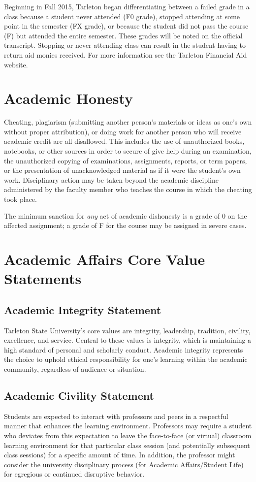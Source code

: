 \documentclass[10pt]{article}
\begin{document}
Beginning in Fall 2015, Tarleton began differentiating between a failed grade in a class because a student never attended (F0 grade), stopped attending at some point in the semester (FX grade), or because the student did not pass the course (F) but attended the entire semester. These grades will be noted on the official transcript. Stopping or never attending class can result in the student having to return aid monies received.  For more information see the Tarleton Financial Aid website.

\section*{Academic Honesty}
\label{sec:org1ce3334}

Cheating, plagiarism (submitting another person’s materials or ideas as one’s own without proper attribution), or doing work for another person who will receive academic credit are all disallowed. This includes the use of unauthorized books, notebooks, or other sources in order to secure of give help during an examination, the unauthorized copying of examinations, assignments, reports, or term papers, or the presentation of unacknowledged material as if it were the student’s own work. Disciplinary action may be taken beyond the academic discipline administered by the faculty member who teaches the course in which the cheating took place.

The minimum sanction for \emph{any} act of academic dishonesty is a grade of 0 on the affected assignment; a grade of F for the course may be assigned in severe cases.

\section*{Academic Affairs Core Value Statements}
\label{sec:org855da88}
\subsection*{Academic Integrity Statement}
\label{sec:org37888aa}
Tarleton State University's core values are integrity, leadership, tradition, civility, excellence, and service.  Central to these values is integrity, which is maintaining a high standard of personal and scholarly conduct.  Academic integrity represents the choice to uphold ethical responsibility for one’s learning within the academic community, regardless of audience or situation.

\subsection*{Academic Civility Statement}
\label{sec:org70c81bb}
Students are expected to interact with professors and peers in a respectful manner that enhances the learning environment. Professors may require a student who deviates from this expectation to leave the face-to-face (or virtual) classroom learning environment for that particular class session (and potentially subsequent class sessions) for a specific amount of time. In addition, the professor might consider the university disciplinary process (for Academic Affairs/Student Life) for egregious or continued disruptive behavior.
\end{document}
